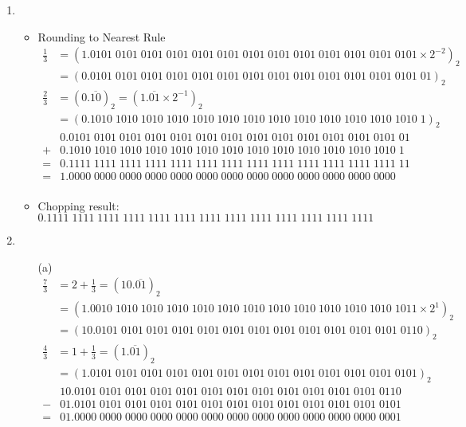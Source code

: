 \documentclass[UTF8]{ctexart}
\begin{document}
\begin{enumerate}
\item \begin{itemize}
\item Rounding to Nearest Rule \\
\begin{align*}
\frac{1}{3} &= (1.0101\;0101\;0101\;0101\;0101\;0101\;0101\;0101\;0101\;0101\;0101\;0101\;0101 \times 2^{-2})_2 \\
&=(0.0101\;0101\;0101\;0101\;0101\;0101\;0101\;0101\;0101\;0101\;0101\;0101\;0101\;01)_2
\end{align*}
\begin{align*}
\frac{2}{3} &= (0.\overline{10})_2 = (1.\overline{01} \times 2^{-1})_2 \\
&=(0.1010\;1010\;1010\;1010\;1010\;1010\;1010\;1010\;1010\;1010\;1010\;1010\;1010\;1)_2
\end{align*}
\begin{align*}
 &0.0101\;0101\;0101\;0101\;0101\;0101\;0101\;0101\;0101\;0101\;0101\;0101\;0101\;01 \\
+&0.1010\;1010\;1010\;1010\;1010\;1010\;1010\;1010\;1010\;1010\;1010\;1010\;1010\;1 \\
\hline
=&0.1111\;1111\;1111\;1111\;1111\;1111\;1111\;1111\;1111\;1111\;1111\;1111\;1111\;11 \\
=&1.0000\;0000\;0000\;0000\;0000\;0000\;0000\;0000\;0000\;0000\;0000\;0000\;0000 \\
\end{align*}
\item Chopping result: \\
$0.1111\;1111\;1111\;1111\;1111\;1111\;1111\;1111\;1111\;1111\;1111\;1111\;1111$
\end{itemize}

\item \begin{itemize}
\item[(a)] \begin{align*}
\frac{7}{3} &= 2 + \frac{1}{3} = (10.\overline{01})_2 \\
&= (1.0010\;1010\;1010\;1010\;1010\;1010\;1010\;1010\;1010\;1010\;1010\;1010\;1011 \times 2^1)_2 \\
&=(10.0101\;0101\;0101\;0101\;0101\;0101\;0101\;0101\;0101\;0101\;0101\;0101\;0110)_2
\end{align*}
\begin{align*}
\frac{4}{3} &= 1 + \frac{1}{3} = (1.\overline{01})_2 \\
&= (1.0101\;0101\;0101\;0101\;0101\;0101\;0101\;0101\;0101\;0101\;0101\;0101\;0101)_2
\end{align*}
\begin{align*}
 &10.0101\;0101\;0101\;0101\;0101\;0101\;0101\;0101\;0101\;0101\;0101\;0101\;0110 \\
-&01.0101\;0101\;0101\;0101\;0101\;0101\;0101\;0101\;0101\;0101\;0101\;0101\;0101 \\
\hline
=&01.0000\;0000\;0000\;0000\;0000\;0000\;0000\;0000\;0000\;0000\;0000\;0000\;0001
\end{align*}


\end{itemize}
\end{enumerate}
\end{document}

